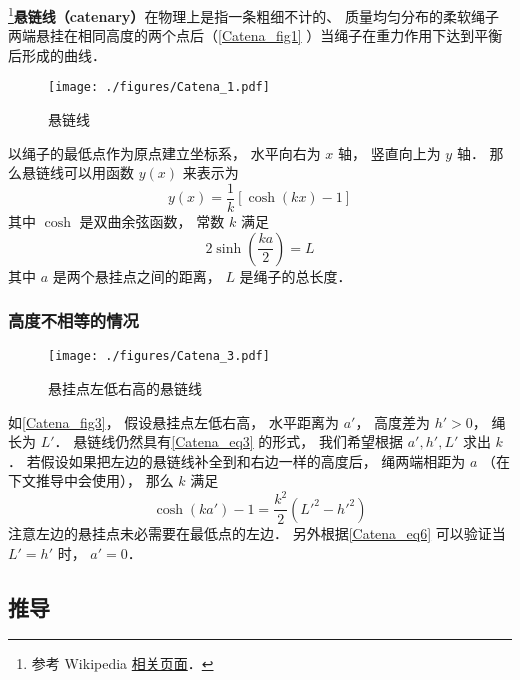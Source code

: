

\footnote{参考 Wikipedia \href{https://en.wikipedia.org/wiki/Catenary}{相关页面}．}\textbf{悬链线（catenary）}在物理上是指一条粗细不计的、 质量均匀分布的柔软绳子两端悬挂在相同高度的两个点后（\autoref{Catena_fig1} ）当绳子在重力作用下达到平衡后形成的曲线．

\begin{figure}[ht]
\centering
\texttt{[image: ./figures/Catena\_1.pdf]}
\caption{悬链线} \label{Catena_fig1}
\end{figure}

以绳子的最低点作为原点建立坐标系， 水平向右为 $x$ 轴， 竖直向上为 $y$ 轴． 那么悬链线可以用函数 $y(x)$ 来表示为
\begin{equation}\label{Catena_eq3}
y(x) = \frac{1}{k}[\cosh(kx)-1]
\end{equation}
其中 $\cosh$ 是双曲余弦函数， 常数 $k$ 满足
\begin{equation}
2\sinh(\frac{ka}{2}) = L
\end{equation}
其中 $a$ 是两个悬挂点之间的距离， $L$ 是绳子的总长度．

\subsubsection{高度不相等的情况}
\begin{figure}[ht]
\centering
\texttt{[image: ./figures/Catena\_3.pdf]}
\caption{悬挂点左低右高的悬链线} \label{Catena_fig3}
\end{figure}
如\autoref{Catena_fig3}， 假设悬挂点左低右高， 水平距离为 $a'$， 高度差为 $h' > 0$， 绳长为 $L'$． 悬链线仍然具有\autoref{Catena_eq3} 的形式， 我们希望根据 $a', h', L'$ 求出 $k$． 若假设如果把左边的悬链线补全到和右边一样的高度后， 绳两端相距为 $a$ （在下文推导中会使用）， 那么 $k$ 满足
\begin{equation}\label{Catena_eq6}
\cosh(ka') - 1 = \frac{k^2}{2}(L'^2 - h'^2)
\end{equation}
注意左边的悬挂点未必需要在最低点的左边． 另外根据\autoref{Catena_eq6} 可以验证当 $L' = h'$ 时， $a' = 0$．

\subsection{推导}


